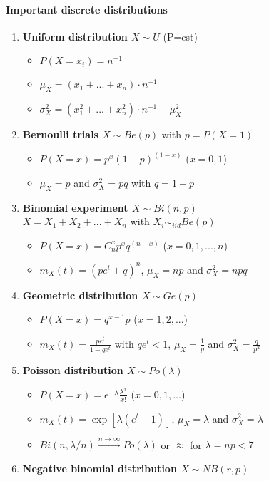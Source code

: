 \documentclass[paper=a4,fontsize=8pt,pagesize,DIV=calc]{scrartcl}
\newcounter{row}
\begin{document}
\begin{multicols}{3}
\paragraph{Important discrete distributions}
\begin{enumerate}
\item \textbf{Uniform distribution  $X \sim U$} (P=cst)
\begin{itemize}
\item $P(X=x_i)=n^{-1}$
\item $\mu_X=(x_1+...+x_n)\cdot n^{-1}$
\item $\sigma^2_X=(x_1^2+...+x_n^2)\cdot n^{-1}-\mu_X^2$
\end{itemize}
\item \textbf{Bernoulli trials  $X \sim Be(p)$} with $p=P(X=1)$
\begin{itemize}
\item $P(X=x)=p^x(1-p)^{(1-x)}$  ($x =0,1$)
\item $\mu_X=p$ and $\sigma^2_X=pq$ with $q=1-p$
\end{itemize}
\item \textbf{Binomial experiment $X \sim Bi(n,p)$}
~~\\$X=X_1+X_2+...+X_n$ with $X_i\sim_{iid} Be(p)$
\begin{itemize}
\item $P(X=x)=C^x_np^xq^{(n-x)}$ ($x =0,1,...,n$)
\item $m_X(t)=(pe^t+q)^n$, $\mu_X=np$ and $\sigma^2_X=npq$
\end{itemize}
\item \textbf{Geometric distribution $X\sim Ge(p)$}
\begin{itemize}
\item $P(X=x)=q^{x-1}p$ ($x =1,2,...$)
\item $m_X(t)=\frac{pe^t}{1-qe^t}$ with $qe^t<1$, $\mu_X=\frac{1}{p}$ and $\sigma^2_X=\frac{q}{p^{2}}$
\end{itemize}
\item \textbf{Poisson distribution $X \sim Po(\lambda)$}
\begin{itemize}
\item $P(X=x)=e^{-\lambda} \frac{\lambda^x}{x!}$  ($x =0,1,...$)
\item $m_X(t)=\exp{[\lambda (e^t-1)]}$, $\mu_X=\lambda$ and $\sigma^2_X=\lambda$
\item $Bi(n,\lambda/n) \xrightarrow{n \rightarrow \infty} Po(\lambda)$ or $\approx$ for $\lambda=np<7$
\end{itemize}
\item \textbf{Negative binomial distribution $X \sim NB(r,p)$}

\end{enumerate}
\end{multicols}
\end{document}
